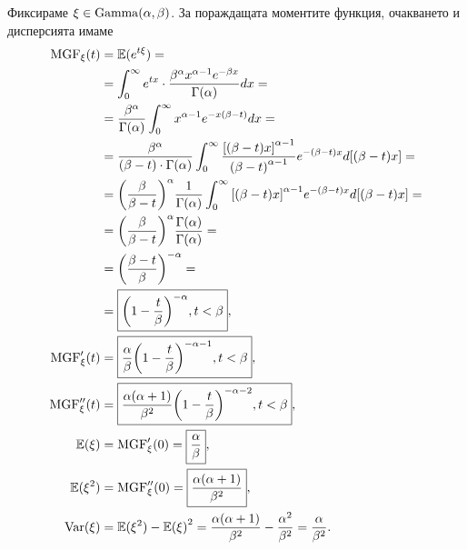 \documentclass[numbers=endperiod, bibliography=totocnumbered]{scrartcl}
\begin{document}
Фиксираме \( \xi \in \operatorname{Gamma}(\alpha, \beta) \). За пораждащата моментите функция, очакването и дисперсията имаме
\begingroup
\allowdisplaybreaks
\begin{align*}
  \operatorname{MGF}_\xi(t)
  &=
  \mathbb{E}(e^{t\xi})
  = \\ &=
  \int_0^\infty e^{tx} \cdot \frac {\beta^\alpha x^{\alpha-1} e^{-\beta x}} {\Gamma(\alpha)} dx
  = \\ &=
  \frac {\beta^\alpha} {\Gamma(\alpha)} \int_0^\infty x^{\alpha-1} e^{-x(\beta-t)} dx
  = \\ &=
  \frac {\beta^\alpha} {(\beta-t) \cdot \Gamma(\alpha)} \int_0^\infty \frac {{[(\beta-t)x]}^{\alpha-1}} {{(\beta-t)}^{\alpha-1}} e^{-(\beta-t)x} d[(\beta-t)x]
  = \\ &=
  {\left(\frac \beta {\beta-t} \right)}^\alpha \frac 1 {\Gamma(\alpha)} \int_0^\infty {[(\beta-t)x]}^{\alpha-1} e^{-(\beta-t)x} d[(\beta-t)x]
  = \\ &=
  {\left(\frac \beta {\beta-t} \right)}^\alpha \frac {\Gamma(\alpha)} {\Gamma(\alpha)}
  = \\ &=
  {\left(\frac {\beta-t} \beta \right)}^{-\alpha}
  = \\ &=
  \boxed{{\left(1 - \frac t \beta \right)}^{-\alpha}, t < \beta},
  \\
  \operatorname{MGF}'_\xi(t)
  &=
  \boxed{\frac \alpha \beta {\left(1 - \frac t \beta \right)}^{-\alpha-1}, t < \beta},
  \\
  \operatorname{MGF}''_\xi(t)
  &=
  \boxed{\frac {\alpha(\alpha+1)} {\beta^2} {\left(1 - \frac t \beta \right)}^{-\alpha-2}, t < \beta},
  \\
  \mathbb{E}(\xi)
  &=
  \operatorname{MGF}'_\xi(0)
  =
  \boxed{\frac \alpha \beta},
  \\
  \mathbb{E}(\xi^2)
  &=
  \operatorname{MGF}''_\xi(0)
  =
  \boxed{\frac {\alpha(\alpha+1)} {\beta^2}},
  \\
  \operatorname{Var}(\xi)
  &=
  \mathbb{E}(\xi^2) - {\mathbb{E}(\xi)}^2
  =
  \frac {\alpha(\alpha+1)} {\beta^2} - \frac {\alpha^2} {\beta^2}
  =
  \frac \alpha {\beta^2}.
\end{align*}
\endgroup
\end{document}
